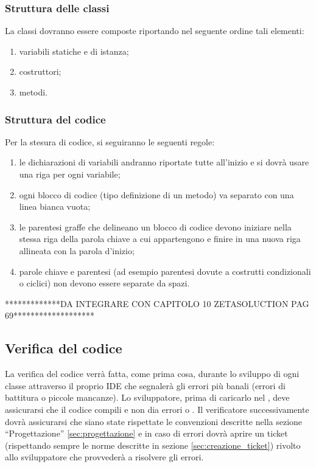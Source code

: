 {\begin{itemize}
\end{itemize}

\subsubsection{Struttura delle classi}
La classi dovranno essere composte riportando nel seguente ordine tali elementi:
\begin{enumerate}
\item variabili statiche e di istanza;
\item costruttori;
\item metodi.
\end{enumerate}

\subsubsection{Struttura del codice}
Per la stesura di codice, si seguiranno le seguenti regole:
\begin{enumerate}
\item le dichiarazioni di variabili andranno riportate tutte all'inizio e si dovrà usare una riga per ogni variabile;
\item ogni blocco di codice (tipo definizione di un metodo) va separato  con una linea bianca vuota;
\item le parentesi graffe che delineano un blocco di codice devono iniziare nella stessa riga della parola chiave a cui appartengono e finire in una nuova riga allineata con la parola d'inizio;
\item parole chiave e parentesi (ad esempio parentesi dovute a costrutti condizionali o ciclici) non devono essere separate da spazi.
\end{enumerate}


*************DA INTEGRARE CON CAPITOLO 10 ZETASOLUCTION PAG 69*******************

\subsection{Verifica del codice}
La verifica del codice verrà fatta, come prima cosa, durante lo sviluppo di ogni classe attraverso il proprio IDE che segnalerà gli errori più banali (errori di battitura o piccole mancanze). Lo sviluppatore, prima di caricarlo nel , deve assicurarsi che il codice compili e non dia errori o . Il verificatore successivamente dovrà assicurarsi che siano state rispettate le convenzioni descritte nella sezione ``Progettazione'' \ref{sec:progettazione} e in caso di errori dovrà aprire un ticket (rispettando sempre le norme descritte in sezione \ref{sec:creazione_ticket}) rivolto allo sviluppatore che provvederà a risolvere gli errori.


}
